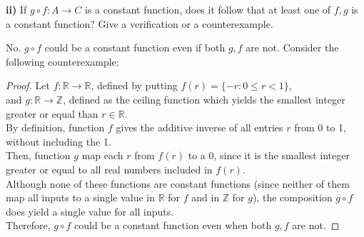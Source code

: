 \documentclass[titlepage, letterpaper, fleqn]{article}
\newcommand{\spacepls}{\vspace{5mm}}
\begin{document}
\textbf{ii)} If \(g \circ f \colon A \to C\) is a constant function, does it follow that at least one of \(f,g\) is a constant function? Give a verification or a counterexample.

\spacepls

No. \(g \circ f\) could be a constant function even if both \(g,f\) are not. Consider the following counterexample:

\begin{proof}
Let \(f \colon \mathbb{R} \to \mathbb{R}\), defined by putting \(f(r) = \{-r \colon 0 \leq r < 1\}\),\\
and \(g \colon \mathbb{R} \to \mathbb{Z}\), defined as the ceiling function which yields the smallest integer greater or equal than \(r \in \mathbb{R}\).\\
By definition, function \(f\) gives the additive inverse of all entries \(r\) from 0 to 1, without including the 1.\\
Then, function \(g\) map each \(r\) from \(f(r)\) to a 0, since it is the smallest integer greater or equal to all real numbers included in \(f(r)\).\\
Although none of these functions are constant functions (since neither of them map all inputs to a single value in \(\mathbb{R}\) for \(f\) and in \(\mathbb{Z}\) for \(g\)),
the composition \(g \circ f\) does yield a single value for all inputs.\\
Therefore, \(g \circ f\) could be a constant function even when both \(g,f\) are not.
\end{proof}
\end{document}
